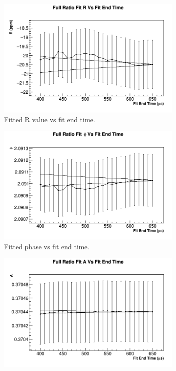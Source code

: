 	\begin{figure}[]
	\centering
	    \begin{subfigure}[t]{0.45\textwidth}
		    \centering
			\includegraphics[width=\textwidth]{RatioCBO_R_FE_Canv}
		    \caption{Fitted R value vs fit end time.}
	    \end{subfigure}
	    \begin{subfigure}[t]{0.45\textwidth}
		    \centering
			\includegraphics[width=\textwidth]{RatioCBO_phi_FE_Canv}
		    \caption{Fitted \gmtwo phase vs fit end time.}
	    \end{subfigure}%
	    \vspace{4mm}
	    \begin{subfigure}[t]{0.45\textwidth}
		    \centering
			\includegraphics[width=\textwidth]{RatioCBO_A_FE_Canv}

\end{subfigure}
\end{figure}
